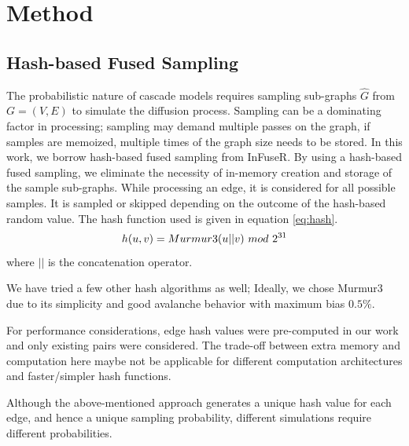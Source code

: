 \documentclass[10pt,journal,compsoc]{IEEEtran}
\begin{document}
\section{Method}\label{sec:method}

\subsection{Hash-based Fused Sampling}
The probabilistic nature of cascade models requires sampling sub-graphs $\hat{G}$ from $G = (V, E)$ to simulate the diffusion process.  Sampling can be a dominating factor in processing; sampling may demand multiple passes on the graph, if samples are memoized, multiple times of the graph size needs to be stored.
In this work, we borrow hash-based fused sampling from {\sc InFuseR}\cite{infuser}. By using a hash-based fused sampling, we eliminate the necessity of in-memory creation and storage of the sample sub-graphs.
While processing an edge, it is considered for all possible samples.
It is sampled or skipped depending on the outcome of the hash-based random value. The hash function used is given in equation \ref{eq:hash}.
\begin{equation}
    \label{eq:hash}
    h(u,v) = \mbox{{\sc Murmur3}}(u||v)~mod~2^{31}  
\end{equation}
where $||$ is the concatenation operator. 

We have tried a few other hash algorithms as well; Ideally, we chose {{\sc Murmur3}} due to its simplicity and good avalanche behavior with maximum bias $0.5\%$.

For performance considerations, edge hash values were pre-computed in our work and only existing pairs were considered. The trade-off between extra memory and computation here maybe not be applicable for different computation architectures and faster/simpler hash functions.

Although the above-mentioned approach generates a unique hash value for each edge, and hence a unique sampling probability, different simulations require different probabilities.
\end{document}
